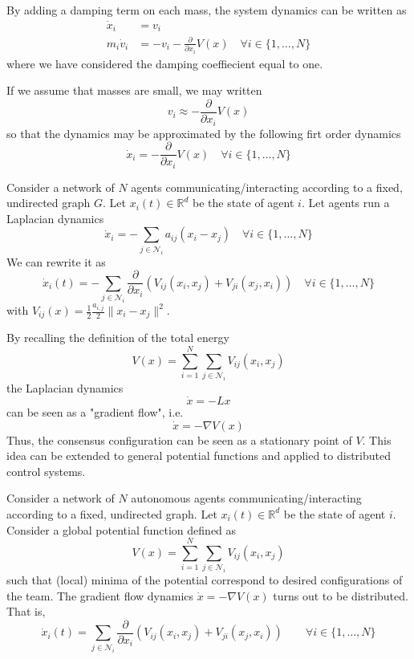 \documentclass{book}
\newcommand{\R}{\mathbb{R}}
\theoremstyle{theoremv2}
\theoremstyle{defv2}
\theoremstyle{remark}
\theoremstyle{remark}
\theoremstyle{definition}
\theoremstyle{definition}
\begin{document}
By adding a damping term on each mass, the system dynamics can be written as 
\begin{align*}
    \dot{x}_i &= v_i\\
    m_i\dot{v}_i &= -v_i - \displaystyle\frac{\partial}{\partial x_i}V(x) \quad \forall i \in \{ 1,\dots,N \}
\end{align*}
where we have considered the damping coeffiecient equal to one. 

If we assume that masses are small, we may written
\[
    v_i \approx - \displaystyle\frac{\partial}{\partial x_i} V(x)
\]
so that the dynamics may be approximated by the following firt order dynamics
\[
    \dot{x}_i = - \displaystyle\frac{\partial}{\partial x_i}V(x) \quad \forall i\in\{ 1,\dots,N \}
\]

Consider a network of $N$ agents communicating/interacting according to a fixed, undirected graph $G$. Let $x_i(t)\in\R^d$ be the state of agent $i$. Let agents run a Laplacian dynamics
\[
    \dot{x}_i = - \displaystyle\sum_{j\in\mathcal{N}_i}a_{ij}(x_i-x_j) \quad \forall i\in\{ 1,\dots,N \}
\]
We can rewrite it as 
\[
    \dot{x}_i(t) = - \displaystyle\sum_{j\in \mathcal{N}_i} \displaystyle\frac{\partial}{\partial x_i}\left(V_{ij}(x_i,x_j)+V_{ji}(x_j,x_i)\right) \quad \forall i \in \{ 1,\dots,N \}
\]
with $V_{ij}(x) = \displaystyle\frac{1}{2}\displaystyle\frac{a_{i,j}}{2}\|x_i-x_j\|^2$.

By recalling the definition of the total energy
\[
    V(x)=\displaystyle\sum_{i=1}^{N}\displaystyle\sum_{j\in\mathcal{N}_i}V_{ij}(x_i,x_j)
\]
the Laplacian dynamics 
\[
    \dot{x} = -Lx
\]
can be seen as a "gradient flow", i.e. 
\[
    \dot{x} = -\nabla V(x)
\]
Thus, the consensus configuration can be seen as a stationary point of $V$. This idea can be extended to general potential functions and applied to distributed control systems.

Consider a network of $N$ autonomous agents communicating/interacting according to a fixed, undirected graph. Let $x_i(t)\in\R^d$ be the state of agent $i$. Consider a global potential function defined as 
\[
    V(x)=\displaystyle\sum_{i=1}^{N}\displaystyle\sum_{j\in\mathcal{N}_i}V_{ij}(x_i,x_j)
\]
such that (local) minima of the potential correspond to desired configurations of the team. The gradient flow dynamics $\dot{x} = -\nabla V(x)$ turns out to be distributed. That is,
 \[
     \dot{x}_i(t) = \displaystyle\sum_{j\in\mathcal{N}_i}\displaystyle\frac{\partial}{\partial x_i}\left(V_{ij}(x_i,x_j)+V_{ji}(x_j,x_i)\right) \qquad \forall i \in \{ 1,\dots,N \}
 \]
\end{document}
